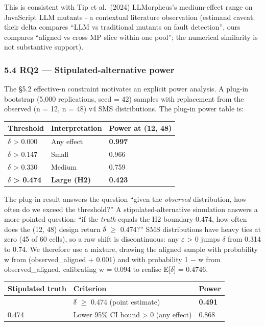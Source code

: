 \documentclass[review,12pt,authoryear]{elsarticle}
\newcounter{none}                   %
\begin{document}
This is consistent with Tip et al.~(2024) LLMorpheus's medium-effect
range on JavaScript LLM mutants - a contextual literature observation
(estimand caveat: their delta compares ``LLM vs traditional mutants on
fault detection'', ours compares ``aligned vs cross MP slice within one
pool''; the numerical similarity is not substantive support).

\subsubsection{5.4 RQ2 --- Stipulated-alternative
power}\label{rq2-stipulated-alternative-power}

The §5.2 effective-n constraint motivates an explicit power analysis. A
plug-in bootstrap (5,000 replications, seed = 42) samples with
replacement from the observed (n = 12, n = 48) v4 SMS distributions. The
plug-in power table is:

{\def\LTcaptype{none} %
\begin{longtable}[]{@{}lll@{}}
\toprule\noalign{}
Threshold & Interpretation & Power at (12, 48) \\
\midrule\noalign{}
\endhead
\bottomrule\noalign{}
\endlastfoot
$\delta$ \textgreater{} 0.000 & Any effect & \textbf{0.997} \\
$\delta$ \textgreater{} 0.147 & Small & 0.966 \\
$\delta$ \textgreater{} 0.330 & Medium & 0.759 \\
\textbf{$\delta$ \textgreater{} 0.474} & \textbf{Large (H2)} &
\textbf{0.423} \\
\end{longtable}
}

The plug-in result answers the question ``given the \emph{observed}
distribution, how often do we exceed the threshold?'' A
stipulated-alternative simulation answers a more pointed question: ``if
the \emph{truth} equals the H2 boundary 0.474, how often does the (12,
48) design return $\delta$̂ $\geq$ 0.474?'' SMS distributions have heavy ties at zero
(45 of 60 cells), so a raw shift is discontinuous: any $\varepsilon$ \textgreater{}
0 jumps $\delta$ from 0.314 to 0.74. We therefore use a mixture, drawing the
aligned sample with probability w from (observed\_aligned + 0.001) and
with probability 1 − w from observed\_aligned, calibrating w = 0.094 to
realise E{[}$\delta${]} = 0.4746.

{\def\LTcaptype{none} %
\begin{longtable}[]{@{}lll@{}}
\toprule\noalign{}
Stipulated truth & Criterion & Power \\
\midrule\noalign{}
\endhead
\bottomrule\noalign{}
\endlastfoot
0.474 & $\delta$̂ $\geq$ 0.474 (point estimate) & \textbf{0.491} \\
0.474 & Lower 95\% CI bound \textgreater{} 0 (any effect) & 0.868 \\
\end{longtable}
}
\end{document}
